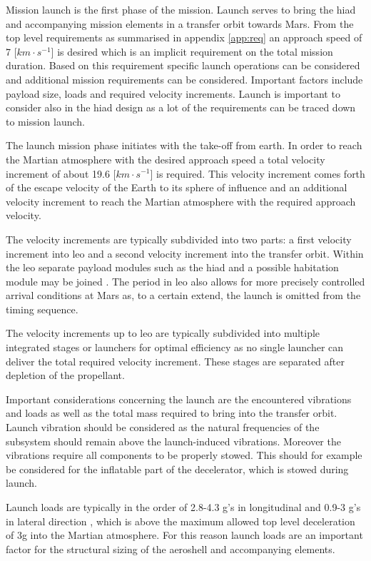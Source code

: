 Mission launch is the first phase of the mission. Launch serves to bring the \gls{hiad} and accompanying mission elements in a transfer orbit towards Mars. From the top level requirements as summarised in appendix \ref{app:req} an approach speed of 7 [$km\cdot s^{-1}$] is desired which is an implicit requirement on the total mission duration.
Based on this requirement specific launch operations can be considered and additional mission requirements can be considered. Important factors include payload size, loads and required velocity increments. Launch is important to consider also in the \gls{hiad} design as a lot of the requirements can be traced down to mission launch.

The launch mission phase initiates with the take-off from earth. In order to reach the Martian atmosphere with the desired approach speed a total velocity increment of about 19.6 [$km\cdot s^{-1}$] is required. This velocity increment comes forth of the escape velocity of the Earth to its sphere of influence and an additional velocity increment to reach the Martian atmosphere with the required approach velocity.

The velocity increments are typically subdivided into two parts: a first velocity increment into \gls{leo} and a second velocity increment into the transfer orbit. Within the \gls{leo} separate payload modules such as the \gls{hiad} and a possible habitation module may be joined \cite{George2009}. The period in \gls{leo} also allows for more precisely controlled arrival conditions at Mars as, to a certain extend, the launch is omitted from the timing sequence. 

The velocity increments up to \gls{leo} are typically subdivided into multiple integrated stages or launchers for optimal efficiency as no single launcher can deliver the total required velocity increment. These stages are separated after depletion of the propellant.

Important considerations concerning the launch are the encountered vibrations and loads as well as the total mass required to bring into the transfer orbit. Launch vibration should be considered as the natural frequencies of the subsystem should remain above the launch-induced vibrations. Moreover the vibrations require all components to be properly stowed. This should for example be considered for the inflatable part of the decelerator, which is stowed during launch.

Launch loads are typically in the order of 2.8-4.3 g's in longitudinal and 0.9-3 g's in lateral direction \cite{Wertz2011}, which is above the maximum allowed top level deceleration of 3g into the Martian atmosphere. For this reason launch loads are an important factor for the structural sizing of the aeroshell and accompanying elements. 


